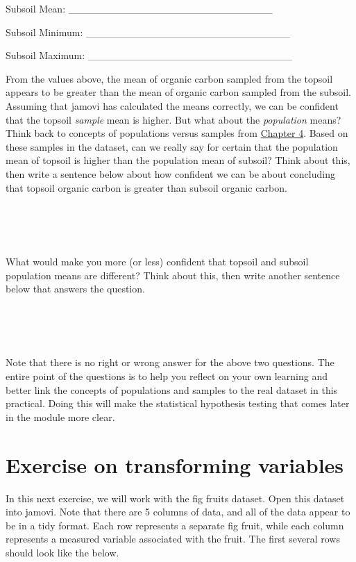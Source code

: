 \documentclass[
]{scrbook}
\begin{document}
Subsoil Mean: \_\_\_\_\_\_\_\_\_\_\_\_\_\_\_\_\_\_\_\_\_\_\_\_\_\_\_\_

Subsoil Minimum: \_\_\_\_\_\_\_\_\_\_\_\_\_\_\_\_\_\_\_\_\_\_\_\_\_\_\_\_

Subsoil Maximum: \_\_\_\_\_\_\_\_\_\_\_\_\_\_\_\_\_\_\_\_\_\_\_\_\_\_\_\_

From the values above, the mean of organic carbon sampled from the topsoil appears to be greater than the mean of organic carbon sampled from the subsoil.
Assuming that jamovi has calculated the means correctly, we can be confident that the topsoil \emph{sample} mean is higher.
But what about the \emph{population} means?
Think back to concepts of populations versus samples from \protect\hyperlink{Chapter_4}{Chapter 4}.
Based on these samples in the dataset, can we really say for certain that the population mean of topsoil is higher than the population mean of subsoil?
Think about this, then write a sentence below about how confident we can be about concluding that topsoil organic carbon is greater than subsoil organic carbon.

\begin{verbatim}




\end{verbatim}

What would make you more (or less) confident that topsoil and subsoil population means are different?
Think about this, then write another sentence below that answers the question.

\begin{verbatim}




\end{verbatim}

Note that there is no right or wrong answer for the above two questions.
The entire point of the questions is to help you reflect on your own learning and better link the concepts of populations and samples to the real dataset in this practical.
Doing this will make the statistical hypothesis testing that comes later in the module more clear.

\hypertarget{transforming_variables_02}{%
\section{Exercise on transforming variables}\label{transforming_variables_02}}

In this next exercise, we will work with the fig fruits dataset.
Open this dataset into jamovi.
Note that there are 5 columns of data, and all of the data appear to be in a tidy format.
Each row represents a separate fig fruit, while each column represents a measured variable associated with the fruit.
The first several rows should look like the below.
\end{document}
